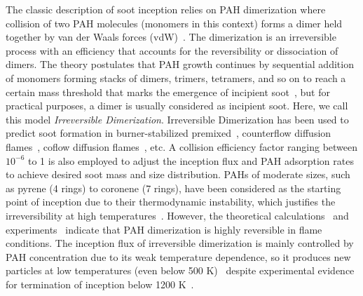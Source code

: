 The classic description of soot inception relies on PAH dimerization where collision of two PAH molecules (monomers in this context) forms a dimer held together by van der Waals forces (vdW)~\citep{frenklach1991detailed}. The dimerization is an irreversible process with an efficiency that accounts for the reversibility or dissociation of dimers. The theory postulates that PAH growth continues by sequential addition of monomers forming stacks of dimers, trimers, tetramers, and so on to reach a certain mass threshold that marks the emergence of incipient soot~\citep{frenklach1991detailed}, but for practical purposes, a dimer is usually considered as incipient soot. Here, we call this model \textit{Irreversible Dimerization}. 
Irreversible Dimerization has been used to predict soot formation in burner-stabilized premixed~\citep{salenbauch2015modeling, desgroux2017comparative}, counterflow diffusion flames~\citep{wang2015soot, xu2021experimental}, coflow diffusion flames~\citep{kholghy2016core, veshkini2016understanding}, etc. A collision efficiency factor ranging between $10^{-6}$ to 1 is also employed to adjust the inception flux and PAH adsorption rates to achieve desired soot mass and size distribution. PAHs of moderate sizes, such as pyrene (4 rings) to coronene (7 rings), have been considered as the starting point of inception due to their thermodynamic instability, which justifies the irreversibility at high temperatures~\citep{frenklach1991detailed}. However, the theoretical calculations~\citep{miller1985calculations} and experiments~\citep{sabbah2010exploring} indicate that PAH dimerization is highly reversible in flame conditions. The inception flux of irreversible dimerization is mainly controlled by PAH concentration due to its weak temperature dependence, so it produces new particles at low temperatures (even below 500 K)~\citep{naseri2022simulating} despite experimental evidence for termination of inception below 1200 K~\citep{sanchez2012polycyclic, cho2016synthesis}. 







